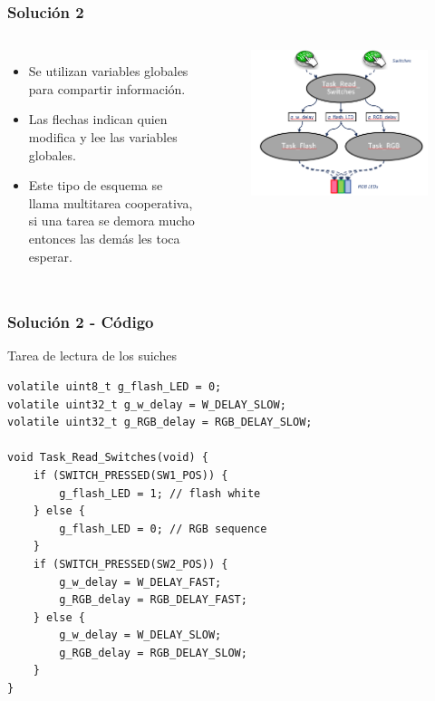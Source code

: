 \documentclass[10.5pt,scale=1.0,t,aspectratio=169,hyperref={pdfpagelabels=false}]{beamer}
\begin{document}
\begin{frame}
	\frametitle{Solución 2}
	\begin{columns}
		\begin{itemize}
			\item Se utilizan variables globales para compartir información. 
			\item Las flechas indican quien modifica y lee las variables globales. 
			\item Este tipo de esquema se llama multitarea cooperativa, si una tarea se demora mucho entonces las demás les toca esperar. 
		\end{itemize}
		\begin{figure}
			\centering
			\includegraphics[scale=0.35]{05_TaskSolution2}
		\end{figure}
	\end{columns}
\end{frame}
\begin{frame}[fragile]
	\frametitle{Solución 2 - Código}
	
	Tarea de lectura de los suiches
	
	\begin{lstlisting}[style=CStyle]
volatile uint8_t g_flash_LED = 0;
volatile uint32_t g_w_delay = W_DELAY_SLOW;
volatile uint32_t g_RGB_delay = RGB_DELAY_SLOW;

void Task_Read_Switches(void) {
	if (SWITCH_PRESSED(SW1_POS)) {
		g_flash_LED = 1; // flash white
	} else {
		g_flash_LED = 0; // RGB sequence
	}
	if (SWITCH_PRESSED(SW2_POS)) { 
		g_w_delay = W_DELAY_FAST;
		g_RGB_delay = RGB_DELAY_FAST;
	} else {
		g_w_delay = W_DELAY_SLOW;
		g_RGB_delay = RGB_DELAY_SLOW;
	}
}
	\end{lstlisting}
\end{frame}
\end{document}

